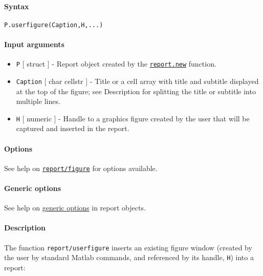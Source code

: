 


	\paragraph{Syntax}

\begin{verbatim}
P.userfigure(Caption,H,...)
\end{verbatim}

\paragraph{Input arguments}

\begin{itemize}
\item
  \texttt{P} {[} struct {]} - Report object created by the
  \href{report/new}{\texttt{report.new}} function.
\item
  \texttt{Caption} {[} char \textbar{} cellstr {]} - Title or a cell
  array with title and subtitle displayed at the top of the figure; see
  Description for splitting the title or subtitle into multiple lines.
\item
  \texttt{H} {[} numeric {]} - Handle to a graphics figure created by
  the user that will be captured and inserted in the report.
\end{itemize}

\paragraph{Options}

See help on \href{report/figure}{\texttt{report/figure}} for options
available.

\paragraph{Generic options}

See help on \href{report/Contents}{generic options} in report objects.

\paragraph{Description}

The function \texttt{report/userfigure} inserts an existing figure
window (created by the user by standard Matlab commands, and referenced
by its handle, \texttt{H}) into a report:

